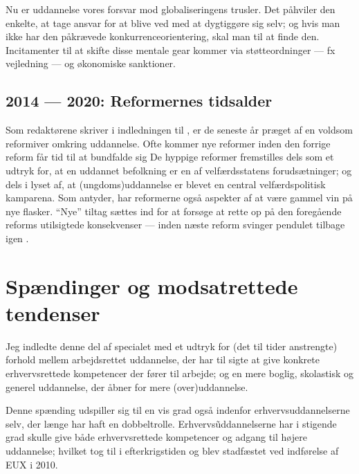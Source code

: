 Nu er uddannelse vores forsvar mod globaliseringens trusler.
Det påhviler den enkelte, at tage ansvar for at blive ved med at dygtiggøre sig selv; og hvis man ikke har den påkrævede konkurrenceorientering, skal man til at finde den.
Incitamenter til at skifte disse mentale gear kommer via støtteordninger — fx vejledning — og økonomiske sanktioner.

\subsection{2014 — 2020: Reformernes tidsalder}

Som redaktørene skriver i indledningen til , er de seneste år præget af en voldsom reformiver omkring uddannelse.
Ofte kommer nye reformer inden den forrige reform får tid til at bundfalde sig
De hyppige reformer fremstilles dels som et udtryk for, at en uddannet befolkning er en af velfærdsstatens forudsætninger; og dels i lyset af, at (ungdoms)uddannelse er blevet en central velfærdspolitisk kamparena.
Som \citeauthor{jorgensenReformenAfErhvervsuddannelserne2016} antyder, har reformerne også aspekter af at være gammel vin på nye flasker.
“Nye” tiltag sættes ind for at forsøge at rette op på den foregående reforms utilsigtede konsekvenser — inden næste reform svinger pendulet tilbage igen \autocite[s.9 ]{jorgensenReformenAfErhvervsuddannelserne2016}.

\section{Spændinger og modsatrettede tendenser}

Jeg indledte denne del af specialet med et udtryk for (det til tider anstrengte) forhold mellem arbejdsrettet uddannelse, der har til sigte at give konkrete erhvervsrettede kompetencer der fører til arbejde; og en mere boglig, skolastisk og generel uddannelse, der åbner for mere (over)uddannelse.

Denne spænding udspiller sig til en vis grad også indenfor erhvervsuddannelserne selv, der længe har haft en dobbeltrolle.
Erhvervs\~uddannelserne har i stigende grad skulle give både erhvervsrettede kompetencer og adgang til højere uddannelse; hvilket tog til i efterkrigstiden \autocite[s. 47ff]{bondergaardHistoricalEmergenceKey2014} og blev stadfæstet ved indførelse af EUX i 2010.


